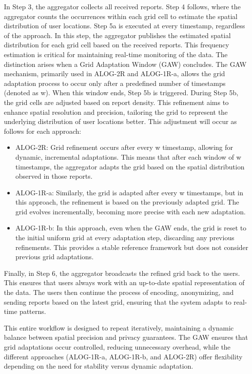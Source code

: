 In Step 3, the aggregator collects all received reports. Step 4 follows, where the aggregator counts the occurrences within each grid cell to estimate the spatial distribution of user locations. Step 5a is executed at every timestamp, regardless of the approach. In this step, the aggregator publishes the estimated spatial distribution for each grid cell based on the received reports. This frequency estimation is critical for maintaining real-time monitoring of the data. The distinction arises when a Grid Adaptation Window (GAW) concludes. The GAW mechanism, primarily used in ALOG-2R and ALOG-1R-a, allows the grid adaptation process to occur only after a predefined number of timestamps (denoted as w). When this window ends, Step 5b is triggered. During Step 5b, the grid cells are adjusted based on report density. This refinement aims to enhance spatial resolution and precision, tailoring the grid to represent the underlying distribution of user locations better. This adjustment will occur as follows for each approach:
% 
\begin{itemize}
    \setlength{\parskip}{0pt}
    \setlength{\itemsep}{0pt plus 1pt}
    \item ALOG-2R: Grid refinement occurs after every w timestamp, allowing for dynamic, incremental adaptations. This means that after each window of w timestamps, the aggregator adapts the grid based on the spatial distribution observed in those reports.
    \item ALOG-1R-a: Similarly, the grid is adapted after every w timestamps, but in this approach, the refinement is based on the previously adapted grid. The grid evolves incrementally, becoming more precise with each new adaptation.
    \item ALOG-1R-b: In this approach, even when the GAW ends, the grid is reset to the initial uniform grid at every adaptation step, discarding any previous refinements. This provides a stable reference framework but does not consider previous grid adaptations.
\end{itemize}
% 
Finally, in Step 6, the aggregator broadcasts the refined grid back to the users. This ensures that users always work with an up-to-date spatial representation of the data. The users then continue the process of encoding, anonymizing, and sending reports based on the latest grid, ensuring that the system adapts to real-time patterns. 

This entire workflow is designed to repeat iteratively, maintaining a dynamic balance between spatial precision and privacy guarantees. The GAW ensures that grid adaptations occur controlled, reducing unnecessary overhead, while the different approaches (ALOG-1R-a, ALOG-1R-b, and ALOG-2R) offer flexibility depending on the need for stability versus dynamic adaptation.

